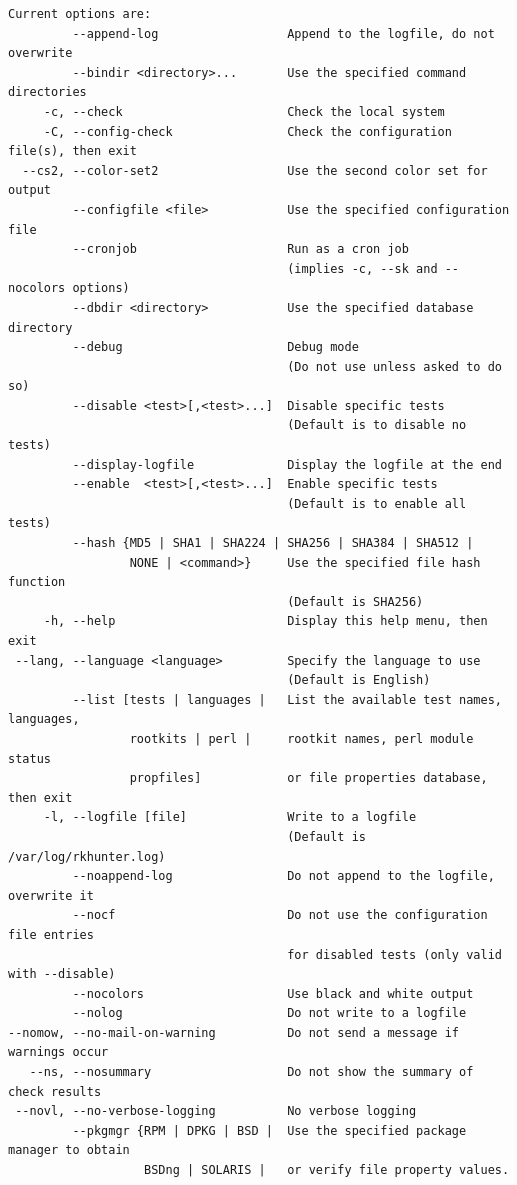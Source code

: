 \documentclass{article}
\begin{document}
\begin{lstlisting}
Current options are:
         --append-log                  Append to the logfile, do not overwrite
         --bindir <directory>...       Use the specified command directories
     -c, --check                       Check the local system
     -C, --config-check                Check the configuration file(s), then exit
  --cs2, --color-set2                  Use the second color set for output
         --configfile <file>           Use the specified configuration file
         --cronjob                     Run as a cron job
                                       (implies -c, --sk and --nocolors options)
         --dbdir <directory>           Use the specified database directory
         --debug                       Debug mode
                                       (Do not use unless asked to do so)
         --disable <test>[,<test>...]  Disable specific tests
                                       (Default is to disable no tests)
         --display-logfile             Display the logfile at the end
         --enable  <test>[,<test>...]  Enable specific tests
                                       (Default is to enable all tests)
         --hash {MD5 | SHA1 | SHA224 | SHA256 | SHA384 | SHA512 |
                 NONE | <command>}     Use the specified file hash function
                                       (Default is SHA256)
     -h, --help                        Display this help menu, then exit
 --lang, --language <language>         Specify the language to use
                                       (Default is English)
         --list [tests | languages |   List the available test names, languages,
                 rootkits | perl |     rootkit names, perl module status
                 propfiles]            or file properties database, then exit
     -l, --logfile [file]              Write to a logfile
                                       (Default is /var/log/rkhunter.log)
         --noappend-log                Do not append to the logfile, overwrite it
         --nocf                        Do not use the configuration file entries
                                       for disabled tests (only valid with --disable)
         --nocolors                    Use black and white output
         --nolog                       Do not write to a logfile
--nomow, --no-mail-on-warning          Do not send a message if warnings occur
   --ns, --nosummary                   Do not show the summary of check results
 --novl, --no-verbose-logging          No verbose logging
         --pkgmgr {RPM | DPKG | BSD |  Use the specified package manager to obtain
                   BSDng | SOLARIS |   or verify file property values.

\end{lstlisting}
\end{document}
